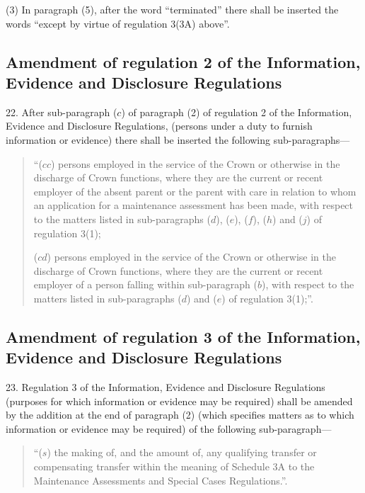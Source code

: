 \documentclass[a4paper]{article}
\begin{document}
(3) In paragraph (5), after the word “terminated” there shall be inserted the words “except by virtue of regulation 3(3A) above”.

\subsection[22. Amendment of regulation 2 of the Information, Evidence and Disclosure Regulations]{Amendment of regulation 2 of the Information, Evidence and Disclosure Regulations}

22.  After sub-paragraph ($c$) of paragraph (2) of regulation 2 of the Information, Evidence and Disclosure Regulations, (persons under a duty to furnish information or evidence) there shall be inserted the following sub-paragraphs—
\begin{quotation}
“($cc$) persons employed in the service of the Crown or otherwise in the discharge of Crown functions, where they are the current or recent employer of the absent parent or the parent with care in relation to whom an application for a maintenance assessment has been made, with respect to the matters listed in sub-paragraphs ($d$), ($e$), ($f$), ($h$) and ($j$) of regulation 3(1);

($cd$) persons employed in the service of the Crown or otherwise in the discharge of Crown functions, where they are the current or recent employer of a person falling within sub-paragraph ($b$), with respect to the matters listed in sub-paragraphs ($d$) and ($e$) of regulation 3(1);”.
\end{quotation}

\subsection[23. Amendment of regulation 3 of the Information, Evidence and Disclosure Regulations]{Amendment of regulation 3 of the Information, Evidence and Disclosure Regulations}

23.  Regulation 3 of the Information, Evidence and Disclosure Regulations (purposes for which information or evidence may be required) shall be amended by the addition at the end of paragraph (2) (which specifies matters as to which information or evidence may be required) of the following sub-paragraph—
\begin{quotation}
“($s$) the making of, and the amount of, any qualifying transfer or compensating transfer within the meaning of Schedule 3A to the Maintenance Assessments and Special Cases Regulations.”.
\end{quotation}
\end{document}
